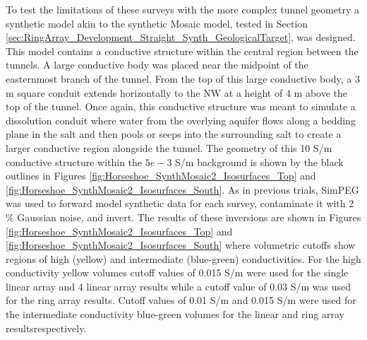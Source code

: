 \documentclass[preprint,authoryear,12pt]{elsarticle}
\providecommand{\DIFaddtex}[1]{{\protect\color{blue}\uwave{#1}}} %
\providecommand{\DIFdeltex}[1]{{\protect\color{red}\sout{#1}}}                      %
\providecommand{\DIFaddbegin}{} %
\providecommand{\DIFaddend}{} %
\providecommand{\DIFdelbegin}{} %
\providecommand{\DIFdelend}{} %
\providecommand{\DIFadd}[1]{\texorpdfstring{\DIFaddtex{#1}}{#1}} %
\providecommand{\DIFdel}[1]{\texorpdfstring{\DIFdeltex{#1}}{}} %
\begin{document}
To test the limitations of these surveys with the more complex tunnel geometry a synthetic model akin to the synthetic Mosaic model, tested in Section \ref{sec:RingArray_Development_Straight_Synth_GeologicalTarget}, was designed. This model contains a conductive structure within the central region between the tunnels. A large conductive body was placed near the midpoint of the easternmost branch of the tunnel. From the top of this large conductive body, a 3 m square conduit extends horizontally to the NW at a height of 4 m above the top of the tunnel. Once again, this conductive structure was meant to simulate a dissolution conduit where water from the overlying aquifer flows along a bedding plane in the salt and then pools or seeps into the surrounding salt to create a larger conductive region alongside the tunnel. The geometry of this 10 S/m conductive structure within the \DIFdelbegin \DIFdel{$5e-3$ }\DIFdelend \DIFaddbegin \DIFadd{$5 \times 10^{\text{-3}}$ }\DIFaddend S/m background is shown by the black outlines in Figures \ref{fig:Horseshoe_SynthMosaic2_Isosurfaces_Top} and \ref{fig:Horseshoe_SynthMosaic2_Isosurfaces_South}. As in previous trials, SimPEG was used to forward model synthetic data for each survey, contaminate it with 2$\%$ Gaussian noise, and invert. The results of these inversions are shown in Figures \ref{fig:Horseshoe_SynthMosaic2_Isosurfaces_Top} and \ref{fig:Horseshoe_SynthMosaic2_Isosurfaces_South} where volumetric cutoffs show regions of high (yellow) and intermediate (blue-green) conductivities. For the high conductivity yellow volumes cutoff values of 0.015 S/m were used for the single linear array and 4 linear array results while a cutoff value of 0.03 S/m was used for the ring array results. Cutoff values of 0.01 S/m and 0.015 S/m were used for the intermediate conductivity blue-green volumes for the linear and ring array results\DIFaddbegin \DIFadd{, }\DIFaddend respectively.
\end{document}

